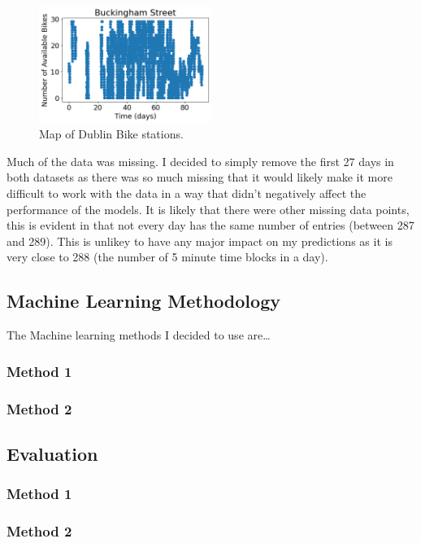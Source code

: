\begin{figure}[H]
    \centering
    \includegraphics[width=0.5\textwidth]{images/buckingham data.png}
    \caption{Map of Dublin Bike stations.}
    \end{figure}
Much of the data was missing. 
I decided to simply remove the first 27 days in both datasets as 
there was so much missing that it would likely make it more difficult to 
work with the data in a way that didn't negatively affect the performance of the models.
It is likely that there were other missing data points, this is evident in that not every day has the same number of entries (between 287 and 289).
This is unlikey to have any major impact on my predictions as it is very close to 288 
(the number of 5 minute time blocks in a day).



\par 


\subsection{Machine Learning Methodology}
The Machine learning methods I decided to use are\dots
\subsubsection{Method 1}
\subsubsection{Method 2}

\subsection{Evaluation}
\subsubsection{Method 1}
\subsubsection{Method 2}
